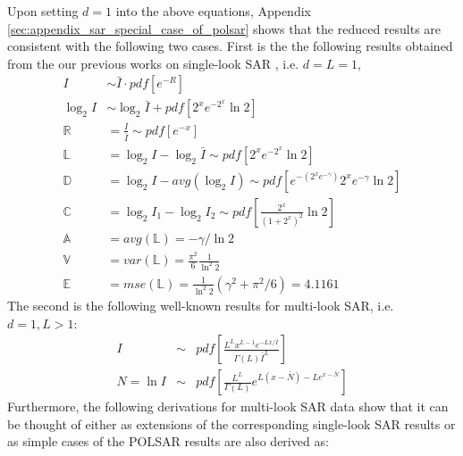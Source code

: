 \documentclass[journal]{IEEEtran}
\begin{document}
Upon setting $d=1$ into the above equations,
  Appendix \ref{sec:appendix_sar_special_case_of_polsar} shows that the reduced results are consistent with the following two cases.
First is the the following results obtained from the our previous works on single-look SAR \cite{Le_2010_ACRS} \cite{Le_2013_TGRS_SAR_MSE}, i.e. $d=L=1$,
\begin{align*}
  I &\sim \bar{I} \cdot pdf \left[ e^{-R} \right] \\
  \log_2{I} &\sim \log_2{\bar{I}} + pdf \left[ 2^xe^{-2^x}\ln2 \right] \\
  \mathbb{R} &= \frac{I}{\bar{I}} \sim pdf \left[ e^{-x} \right]  \\
  \mathbb{L} &= \log_2{I} - \log_2{\bar{I}} \sim pdf \left[ 2^xe^{-2^x}\ln2 \right]\\
  \mathbb{D} &= \log_2{I} - avg(\log_2{I}) \sim pdf \left[ e^{-(2^xe^{-\gamma})} 2^xe^{-\gamma} \ln2 \right] \\
  \mathbb{C} &= \log_2{I_1} - \log_2{I_2} \sim pdf \left[ \frac{2^x}{(1+2^x)^2} \ln2 \right] \\
  \mathbb{A} &= avg(\mathbb{L}) = -\gamma / \ln{2} \\
  \mathbb{V} &= var(\mathbb{L}) = \frac{\pi^2}{6} \frac{1}{ \ln^2{2}} \\
  \mathbb{E} &= mse(\mathbb{L}) = \frac{1}{\ln^2{2}}( \gamma^2 + \pi^2/6 ) = 4.1161 
\end{align*}
The second is the following well-known results for multi-look SAR, i.e. $d=1,L>1$:
  \begin{eqnarray}
I &\sim& pdf \left[ \frac{L^L x^{L-1} e^{-Lx/\bar{I}}}{\Gamma(L) \bar{I}^L} \right] \\
N = \ln{I} &\sim& pdf \left[ \frac{L^L}{\Gamma(L)} e^{L(x-\bar{N})-Le^{x-\bar{N}}} \right]
  \end{eqnarray}
Furthermore, the following derivations for multi-look SAR data
   show that it can be thought of 
    either as extensions of the corresponding single-look SAR results
    or as simple cases of the POLSAR results
  are also derived as:
\end{document}
